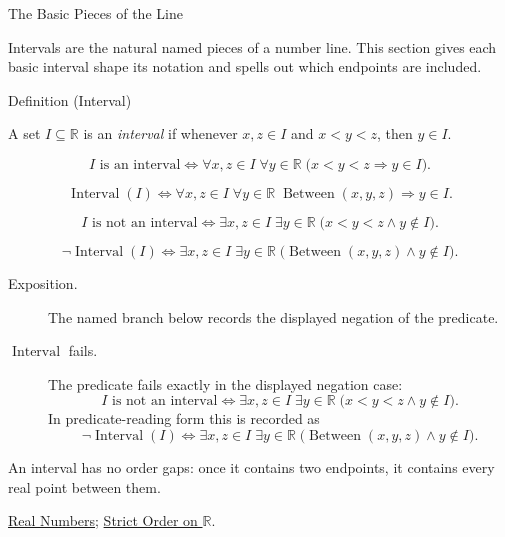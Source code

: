 \begin{topicbox}{The Basic Pieces of the Line}
\begin{exposition}
Intervals are the natural named pieces of a number line. This section gives
each basic interval shape its notation and spells out which endpoints are
included.
\end{exposition}
\end{topicbox}
\begin{definitionbox}{Definition (Interval)}
\begin{definition}[Interval]
\label{def:interval}
A set $I\subseteq\mathbb{R}$ is an \emph{interval} if whenever $x,z\in I$ and
$x<y<z$, then $y\in I$.
\end{definition}
\end{definitionbox}
\begin{remark*}
\[
I\text{ is an interval}
\Longleftrightarrow
\forall x,z\in I\;\forall y\in\mathbb{R}\;
\bigl(x<y<z\Rightarrow y\in I\bigr).
\]
\end{remark*}
\begin{remark*}
\[
\operatorname{Interval}(I)
\Longleftrightarrow
\forall x,z\in I\;\forall y\in\mathbb{R}\;
\operatorname{Between}(x,y,z)\Rightarrow y\in I.
\]
\end{remark*}
\begin{remark*}
\[
I\text{ is not an interval}
\Longleftrightarrow
\exists x,z\in I\;\exists y\in\mathbb{R}\;
\bigl(x<y<z\land y\notin I\bigr).
\]
\end{remark*}
\begin{remark*}
\[
\neg\operatorname{Interval}(I)
\Longleftrightarrow
\exists x,z\in I\;\exists y\in\mathbb{R}\;
\bigl(\operatorname{Between}(x,y,z)\land y\notin I\bigr).
\]
\end{remark*}

\begin{remark*}
\begin{description}
  \item[Exposition.] The named branch below records the displayed negation of the predicate.
  \item[\(\operatorname{Interval}\) fails.] The predicate fails exactly in the displayed negation case:
  \[
  I\text{ is not an interval}
  \Longleftrightarrow
  \exists x,z\in I\;\exists y\in\mathbb{R}\;
  \bigl(x<y<z\land y\notin I\bigr).
  \]
  In predicate-reading form this is recorded as
  \[
  \neg\operatorname{Interval}(I)
  \Longleftrightarrow
  \exists x,z\in I\;\exists y\in\mathbb{R}\;
  \bigl(\operatorname{Between}(x,y,z)\land y\notin I\bigr).
  \]
\end{description}
\end{remark*}
\begin{remark*}[Interpretation]
An interval has no order gaps: once it contains two endpoints, it contains
every real point between them.
\end{remark*}
\begin{dependencies}
\hyperref[def:reals]{Real Numbers};
\hyperref[def:strict-order-on-r]{Strict Order on $\mathbb{R}$}.
\end{dependencies}

